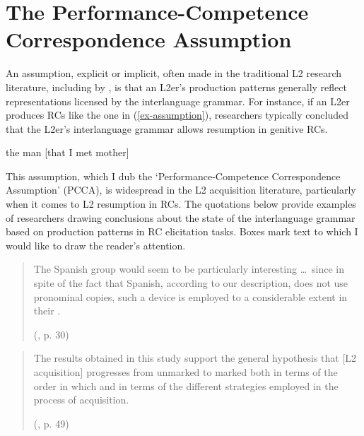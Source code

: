 \section{The Performance-Competence Correspondence Assumption}\label{acq-assumption}

An assumption, explicit or implicit, often made in the traditional L2 research literature, including by \textcite{hyltenstam1984,hyltenstam1990}, is that an L2er's production patterns generally reflect representations licensed by the interlanguage grammar. For instance, if an L2er produces RCs like the one in (\ref{ex-assumption}), researchers typically concluded that the L2er's interlanguage grammar allows resumption in genitive RCs. 

\ex\label{ex-assumption}
\ljudge*the man [that I met  mother]
\xe

This assumption, which I dub the `Performance-Competence Correspondence Assumption' (PCCA), is widespread in the L2 acquisition literature, particularly when it comes to L2 resumption in RCs. The quotations below provide examples of researchers drawing conclusions about the state of the interlanguage grammar based on production patterns in RC elicitation tasks. Boxes mark text to which I would like to draw the reader's attention.

\begin{quote}\begin{samepage}
The Spanish group would seem to be particularly interesting \dots~since in spite of the fact that Spanish, according to our description, does not use pronominal copies, such a device is employed to a considerable extent in their .\par\nobreak\vspace{5pt}
\hfill(\cite{hyltenstam1990}, p. 30)\end{samepage}\end{quote}\vspace{-12pt}

\begin{quote}\begin{samepage}
The results obtained in this study support the general hypothesis that [L2 acquisition] progresses from unmarked to marked both in terms of the order in which  and in terms of the different strategies employed in the process of acquisition.\par\nobreak\vspace{5pt}
\hfill(\cite{pavesi1986}, p. 49)        
\end{samepage}\end{quote}\vspace{-12pt}

